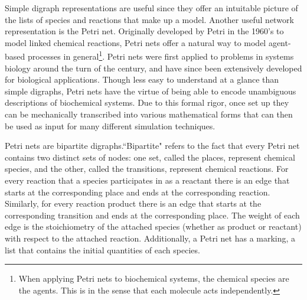 Simple digraph representations are useful since they offer an intuitable picture of the lists of species and reactions that make up a model. Another useful network representation is the Petri net. Originally developed by Petri in the 1960's\cite{Petri:1966vs} to model linked chemical reactions, Petri nets offer a natural way to model agent-based processes in general\footnote{When applying Petri nets to biochemical systems, the chemical species are the agents. This is in the sense that each molecule acts independently.}. Petri nets were first applied to problems in systems biology around the turn of the century\cite{Goss:1998tf}, and have since been extensively developed for biological applications\cite{Pinney:2003tz,Hardy:2004tq,Haas:2006ts}. Though less easy to understand at a glance than simple digraphs, Petri nets have the virtue of being able to encode unambiguous descriptions of biochemical systems. Due to this formal rigor, once set up they can be mechanically transcribed into various mathematical forms that can then be used as input for many different simulation techniques.

Petri nets are bipartite digraphs.``Bipartite" refers to the fact that every Petri net contains two distinct sets of nodes: one set, called the places, represent chemical species, and the other, called the transitions, represent chemical reactions. For every reaction that a species participates in as a reactant there is an edge that starts at the corresponding place and ends at the corresponding reaction. Similarly, for every reaction product there is an edge that starts at the corresponding transition and ends at the corresponding place. The weight of each edge is the stoichiometry of the attached species (whether as product or reactant) with respect to the attached reaction. Additionally, a Petri net has a marking, a list that contains the initial quantities of each species.

